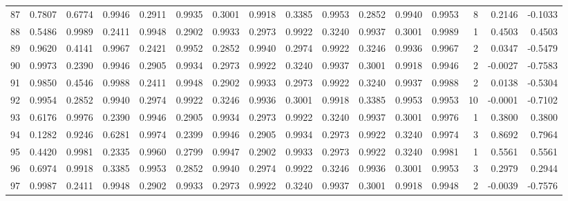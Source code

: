 \begin{tabular}{lrrrrrrrrrrrrrrr}
87  &      0.7807 &  0.6774 &  0.9946 &  0.2911 &  0.9935 &  0.3001 &  0.9918 &  0.3385 &  0.9953 &  0.2852 &   0.9940 &     0.9953 &      8 &                    0.2146 &                    -0.1033 \\
88  &      0.5486 &  0.9989 &  0.2411 &  0.9948 &  0.2902 &  0.9933 &  0.2973 &  0.9922 &  0.3240 &  0.9937 &   0.3001 &     0.9989 &      1 &                    0.4503 &                     0.4503 \\
89  &      0.9620 &  0.4141 &  0.9967 &  0.2421 &  0.9952 &  0.2852 &  0.9940 &  0.2974 &  0.9922 &  0.3246 &   0.9936 &     0.9967 &      2 &                    0.0347 &                    -0.5479 \\
90  &      0.9973 &  0.2390 &  0.9946 &  0.2905 &  0.9934 &  0.2973 &  0.9922 &  0.3240 &  0.9937 &  0.3001 &   0.9918 &     0.9946 &      2 &                   -0.0027 &                    -0.7583 \\
91  &      0.9850 &  0.4546 &  0.9988 &  0.2411 &  0.9948 &  0.2902 &  0.9933 &  0.2973 &  0.9922 &  0.3240 &   0.9937 &     0.9988 &      2 &                    0.0138 &                    -0.5304 \\
92  &      0.9954 &  0.2852 &  0.9940 &  0.2974 &  0.9922 &  0.3246 &  0.9936 &  0.3001 &  0.9918 &  0.3385 &   0.9953 &     0.9953 &     10 &                   -0.0001 &                    -0.7102 \\
93  &      0.6176 &  0.9976 &  0.2390 &  0.9946 &  0.2905 &  0.9934 &  0.2973 &  0.9922 &  0.3240 &  0.9937 &   0.3001 &     0.9976 &      1 &                    0.3800 &                     0.3800 \\
94  &      0.1282 &  0.9246 &  0.6281 &  0.9974 &  0.2399 &  0.9946 &  0.2905 &  0.9934 &  0.2973 &  0.9922 &   0.3240 &     0.9974 &      3 &                    0.8692 &                     0.7964 \\
95  &      0.4420 &  0.9981 &  0.2335 &  0.9960 &  0.2799 &  0.9947 &  0.2902 &  0.9933 &  0.2973 &  0.9922 &   0.3240 &     0.9981 &      1 &                    0.5561 &                     0.5561 \\
96  &      0.6974 &  0.9918 &  0.3385 &  0.9953 &  0.2852 &  0.9940 &  0.2974 &  0.9922 &  0.3246 &  0.9936 &   0.3001 &     0.9953 &      3 &                    0.2979 &                     0.2944 \\
97  &      0.9987 &  0.2411 &  0.9948 &  0.2902 &  0.9933 &  0.2973 &  0.9922 &  0.3240 &  0.9937 &  0.3001 &   0.9918 &     0.9948 &      2 &                   -0.0039 &                    -0.7576 \\

\end{tabular}
